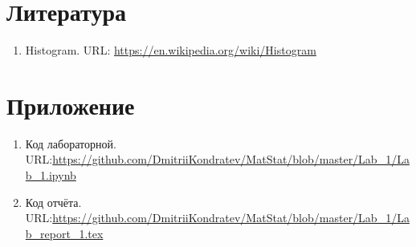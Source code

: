 \documentclass[12pt,a4paper]{article}
\begin{document}
\section{Литература}
	\begin{enumerate}
		\item \label{Histogram} Histogram. URL: \url{https://en.wikipedia.org/wiki/Histogram}
	\end{enumerate}
\section{Приложение}
	\begin{enumerate}
		\item \label{Code} Код лабораторной. URL:\url{https://github.com/DmitriiKondratev/MatStat/blob/master/Lab_1/Lab_1.ipynb}
		
		\item Код отчёта. URL:\url{https://github.com/DmitriiKondratev/MatStat/blob/master/Lab_1/Lab_report_1.tex}
		
	\end{enumerate}
\end{document}
